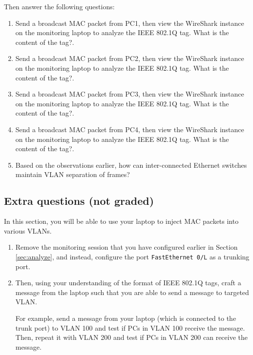 \documentclass[pdftex,12pt,a4paper]{article}
\begin{document}
            Then answer the following questions:
            \begin{enumerate}
                \item Send a broadcast MAC packet from PC1, then view the
                    WireShark instance on the monitoring laptop to analyze the
                    IEEE 802.1Q tag. What is the content of the tag?.
                \item Send a broadcast MAC packet from PC2, then view the
                    WireShark instance on the monitoring laptop to analyze the
                    IEEE 802.1Q tag. What is the content of the tag?.
                \item Send a broadcast MAC packet from PC3, then view the
                    WireShark instance on the monitoring laptop to analyze the
                    IEEE 802.1Q tag. What is the content of the tag?.
                \item Send a broadcast MAC packet from PC4, then view the
                    WireShark instance on the monitoring laptop to analyze the
                    IEEE 802.1Q tag. What is the content of the tag?.
                \item Based on the observations earlier, how can
                    inter-connected Ethernet switches maintain VLAN separation
                    of frames?
            \end{enumerate}

        \subsection{Extra questions (not graded)}

            In this section, you will be able to use your laptop to inject MAC
            packets into various VLANs.

            \begin{enumerate}
                \item Remove the monitoring session that you have configured
                    earlier in Section \ref{sec:analyze}, and instead,
                    configure the port \texttt{FastEthernet 0/L} as a trunking
                    port.

                \item Then, using your understanding of the format of IEEE
                    802.1Q tags, craft a message from the laptop such that you
                    are able to send a message to targeted VLAN.

                    For example, send a message from your laptop (which is connected to
                    the trunk port) to VLAN 100 and test if PCs in VLAN 100 receive the
                    message. Then, repeat it with VLAN 200 and test if PCs in VLAN 200
                    can receive the message.
            \end{enumerate}
\end{document}

